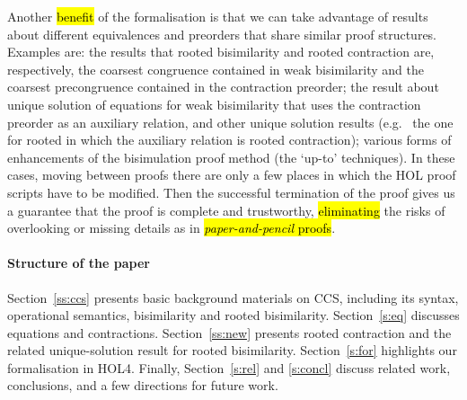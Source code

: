 Another \hl{benefit} of the formalisation is 
that we can take advantage of results about different 
equivalences and preorders that share similar proof structures. 
Examples are: the results that rooted bisimilarity and rooted contraction are,
respectively, the coarsest congruence contained in weak bisimilarity 
and the coarsest precongruence contained in the contraction preorder; 
the result about unique solution of equations for weak bisimilarity that uses the
contraction preorder as an auxiliary relation, and other unique solution results (e.g.~%
the one for rooted in which
the auxiliary relation is rooted contraction); various forms of enhancements of the bisimulation
proof method (the `up-to' techniques).
In these cases, moving between proofs there are only a few places in
which the HOL proof scripts have to be modified.
Then the successful termination of the proof gives us a guarantee that the proof is
complete and trustworthy, \hl{eliminating} the risks 
of overlooking or missing details as in \hl{\emph{paper-and-pencil} proofs}.

\paragraph{Structure of the paper} 

Section~\ref{ss:ccs} presents basic background materials on CCS,
including its syntax, operational semantics, bisimilarity and rooted
bisimilarity.
Section~\ref{s:eq} discusses equations and contractions.
Section~\ref{ss:new} presents rooted contraction and the related
unique-solution result for rooted bisimilarity.
Section~\ref{s:for} highlights our formalisation in HOL4.
Finally,  Section~\ref{s:rel} and \ref{s:concl} discuss related work,
conclusions, and a few directions for future work.

